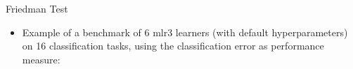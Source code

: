 \documentclass[11pt,compress,t,notes=noshow, aspectratio=169, xcolor=table]{beamer}
\begin{document}
\begin{frame}{Friedman Test}

\begin{itemize}
\item Example of a benchmark of 6 mlr3 learners (with default hyperparameters) on 16 classification tasks, using the classification error as performance measure:

\end{itemize}


\end{frame}
\end{document}
